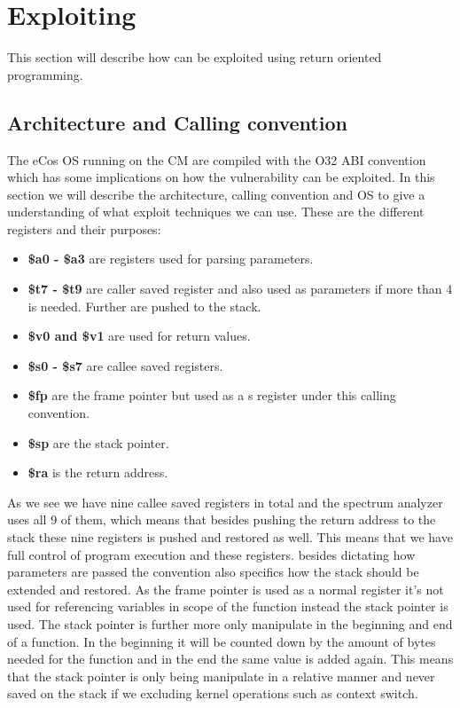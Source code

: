 \chapter{Exploiting \exploitname}
This section will describe how \exploitname can be exploited using return oriented programming.

\section{Architecture and Calling convention}
The eCos OS running on the CM are compiled with the O32 ABI convention which has some implications on how the vulnerability can be exploited. In this section we will describe the architecture, calling convention and OS to give a understanding of what exploit techniques we can use. These are the different registers and their purposes:

\begin{itemize}
    \item \textbf{\$a0 - \$a3} are registers used for parsing parameters.
    \item \textbf{\$t7 - \$t9} are caller saved register and also used as parameters if more than 4 is needed. Further are pushed to the stack.
    \item \textbf{\$v0 and \$v1} are used for return values.
    \item \textbf{\$s0 - \$s7} are callee saved registers.
    \item \textbf{\$fp} are the frame pointer but used as a s register under this calling convention.
    \item \textbf{\$sp} are the stack pointer.
    \item \textbf{\$ra} is the return address.   
\end{itemize}

As we see we have nine callee saved registers in total and the spectrum analyzer uses all 9 of them, which means that besides pushing the return address to the stack these nine registers is pushed and restored as well. This means that we have full control of program execution and these registers.
besides dictating how parameters are passed the convention also specifics how the stack should be extended and restored. As the frame pointer is used as a normal register it's not used for referencing variables in scope of the function instead the stack pointer is used. The stack pointer is further more only manipulate in the beginning and end of a function. In the beginning it will be counted down by the amount of bytes needed for the function and in the end the same value is added again. This means that the stack pointer is only being manipulate in a relative manner and never saved on the stack if we excluding kernel operations such as context switch.

